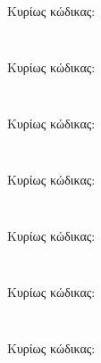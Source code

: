 \documentclass[a4paper,9pt]{article}
\begin{document}
\def\thesubsection {Άσκηση (\roman{subsection})}



\section*{} 
\subsection{}


\noindent Κυρίως κώδικας:
\inputminted[linenos,obeytabs,fontsize=\footnotesize]{c}{files/part1.S}

\subsection{}

\noindent Κυρίως κώδικας:
\inputminted[linenos,obeytabs,fontsize=\footnotesize]{c}{files/part2.c}

\subsection{}

\noindent Κυρίως κώδικας:
\inputminted[linenos,obeytabs,fontsize=\footnotesize]{c}{files/part3.S}
\subsection{}

\noindent Κυρίως κώδικας:
\inputminted[linenos,obeytabs,fontsize=\footnotesize]{c}{files/part4.S}
\subsection{}

\noindent Κυρίως κώδικας:
\inputminted[linenos,obeytabs,fontsize=\footnotesize]{c}{files/part5.S}
\subsection{}

\noindent Κυρίως κώδικας:
\inputminted[linenos,obeytabs,fontsize=\footnotesize]{c}{files/part6.S}
\subsection{}

\noindent Κυρίως κώδικας:
\inputminted[linenos,obeytabs,fontsize=\footnotesize]{c}{files/part7.S}
\end{document}
